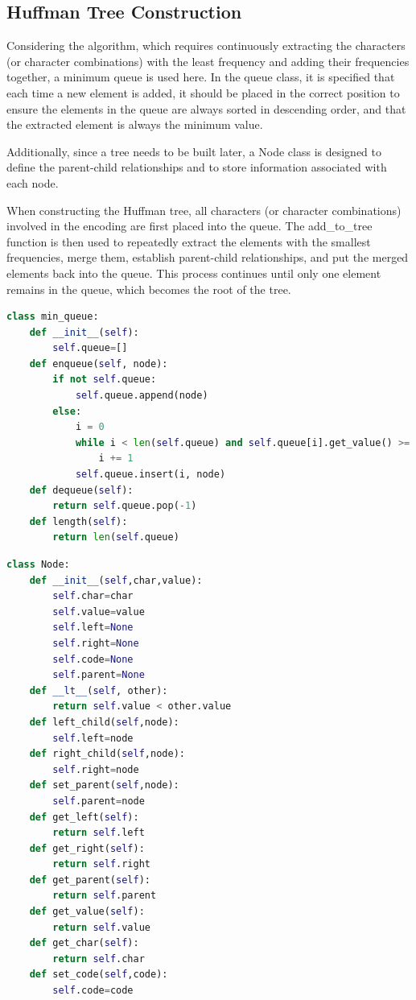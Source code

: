 \documentclass[12pt]{article}
\begin{document}
\subsection{Huffman Tree Construction}
Considering the algorithm, which requires continuously extracting the characters (or character combinations) with the least frequency and adding their frequencies together, a minimum queue is used here. In the queue class, it is specified that each time a new element is added, it should be placed in the correct position to ensure the elements in the queue are always sorted in descending order, and that the extracted element is always the minimum value. 
\par Additionally, since a tree needs to be built later, a Node class is designed to define the parent-child relationships and to store information associated with each node.
\par When constructing the Huffman tree, all characters (or character combinations) involved in the encoding are first placed into the queue. The add\_to\_tree function is then used to repeatedly extract the elements with the smallest frequencies, merge them, establish parent-child relationships, and put the merged elements back into the queue. This process continues until only one element remains in the queue, which becomes the root of the tree.
\begin{tcolorbox}[colframe=black, colback=white, boxrule=0.4mm, sharp corners=southwest, title=Queue Class Code]
    \begin{lstlisting}[language=Python, breaklines=true]
class min_queue:
    def __init__(self):
        self.queue=[]
    def enqueue(self, node):
        if not self.queue:
            self.queue.append(node)
        else:
            i = 0
            while i < len(self.queue) and self.queue[i].get_value() >= node.get_value():
                i += 1
            self.queue.insert(i, node)
    def dequeue(self):
        return self.queue.pop(-1)
    def length(self):
        return len(self.queue)
\end{lstlisting}
\end{tcolorbox}

\begin{tcolorbox}[colframe=black, colback=white, boxrule=0.4mm, sharp corners=southwest, title=Node Class Code]
    \begin{lstlisting}[language=Python, breaklines=true]
class Node:
    def __init__(self,char,value):
        self.char=char
        self.value=value
        self.left=None
        self.right=None
        self.code=None
        self.parent=None
    def __lt__(self, other):
        return self.value < other.value
    def left_child(self,node):
        self.left=node
    def right_child(self,node):
        self.right=node
    def set_parent(self,node):
        self.parent=node
    def get_left(self):
        return self.left
    def get_right(self):
        return self.right
    def get_parent(self):
        return self.parent
    def get_value(self):
        return self.value
    def get_char(self):
        return self.char
    def set_code(self,code):
        self.code=code
\end{lstlisting}
\end{tcolorbox}
\end{document}
